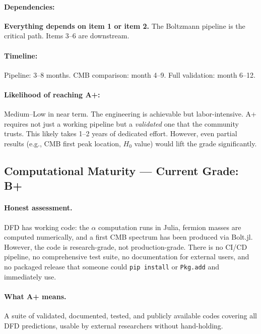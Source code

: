 \documentclass[11pt,a4paper]{article}
\begin{document}
\paragraph{Dependencies:} \textbf{Everything depends on item 1 or item 2.} The Boltzmann pipeline is the critical path. Items 3--6 are downstream.

\paragraph{Timeline:} Pipeline: 3--8 months. CMB comparison: month 4--9. Full validation: month 6--12.

\paragraph{Likelihood of reaching A+:} \textcolor{hardproblem}{Medium--Low in near term}. The engineering is achievable but labor-intensive. A+ requires not just a working pipeline but a \emph{validated} one that the community trusts. This likely takes 1--2 years of dedicated effort. However, even partial results (e.g., CMB first peak location, $H_0$ value) would lift the grade significantly.

\subsection{Computational Maturity --- Current Grade: B+}

\paragraph{Honest assessment.}
DFD has working code: the $\alpha$ computation runs in Julia, fermion masses are computed numerically, and a first CMB spectrum has been produced via Bolt.jl. However, the code is research-grade, not production-grade. There is no CI/CD pipeline, no comprehensive test suite, no documentation for external users, and no packaged release that someone could \texttt{pip install} or \texttt{Pkg.add} and immediately use.

\paragraph{What A+ means.}
A suite of validated, documented, tested, and publicly available codes covering all DFD predictions, usable by external researchers without hand-holding.
\end{document}

